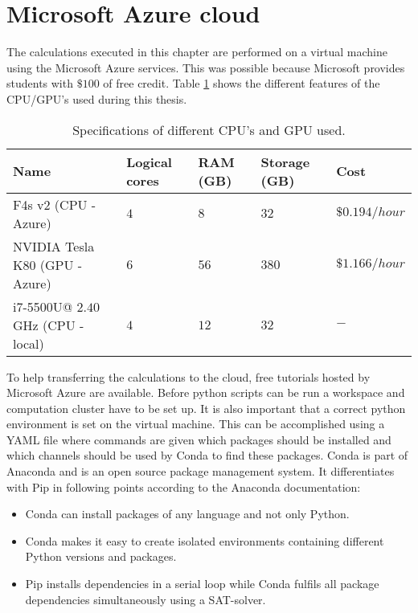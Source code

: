 \section{Microsoft Azure cloud}\label{s:Microsoft Azure cloud}
The calculations executed in this chapter are performed on a virtual machine using the Microsoft Azure services. This was possible because Microsoft provides students with $ \$ 100 $ of free credit. Table \ref{tab:CPU} shows the different features of the CPU/GPU's used during this thesis. 

\begin{table}[hb]
	\centering
	\begin{tabular}{|p{5cm}||p{2cm}|p{2cm}|p{2cm}|p{2cm}|}\hline
		\textbf{Name}	& \textbf{Logical cores} & \textbf{RAM (GB)} & \textbf{Storage (GB)} & \textbf{Cost}\\\hline
		F4s v2 (CPU - Azure)& $ 4 $&$ 8 $  & $ 32 $ & $ \$ 0.194/hour $\\\hline
		NVIDIA Tesla K80 (GPU - Azure)& $ 6 $&$ 56 $  & $ 380 $ & $\$ 1.166/hour$\\\hline
		i7-5500U@ $ 2.40 $ GHz (CPU - local) & $ 4 $ & $ 12 $ & $ 32 $ & $ - $\\\hline
	\end{tabular}
	\caption{Specifications of different CPU's and GPU used.}
	\label{tab:CPU}
\end{table}

To help transferring the calculations to the cloud, free tutorials hosted by Microsoft Azure are available. Before python scripts can be run a workspace and computation cluster have to be set up. It is also important that a correct python environment is set on the virtual machine. This can be accomplished using a YAML file where commands are given which packages should be installed and which channels should be used by Conda to find these packages. Conda is part of Anaconda and is an open source package management system. It differentiates with Pip in following points according to the Anaconda documentation:

\begin{itemize}
	\item Conda can install packages of any language and not only Python.
	\item Conda makes it easy to create isolated environments containing different Python versions and packages.
	\item Pip installs dependencies in a serial loop while Conda fulfils all package dependencies simultaneously using a SAT-solver.  
\end{itemize}

